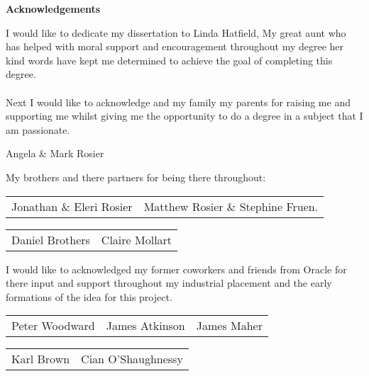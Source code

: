 \thispagestyle{empty}

\begin{center}
    {\LARGE\bf Acknowledgements}
\end{center}
I would like to dedicate my dissertation to Linda Hatfield, My great aunt who has helped with moral support and encouragement throughout my degree her kind words have kept me determined to achieve the goal of completing this degree.\\
\\
Next I would like to acknowledge and my family my parents for raising me and supporting me whilst giving me the opportunity to do a degree in a subject that I am passionate.
\begin{center}
Angela \& Mark Rosier
\end{center}

My brothers and there partners for being there throughout:

\begin{center}
\begin{tabular}{ l r }
Jonathan \& Eleri Rosier & Matthew Rosier \& Stephine Fruen.\\
\end{tabular}
\end{center}

\begin{center}
\begin{tabular}{ l r }
Daniel Brothers & Claire Mollart\\
\end{tabular}
\end{center}

\noindent
I would like to acknowledged my former coworkers and friends from Oracle for there input and support throughout my industrial placement and the early formations of the idea for this project.

\begin{center}
\begin{tabular}{ l c r }
Peter Woodward & James Atkinson & James Maher\\
\end{tabular}
\end{center}

\begin{center}
\begin{tabular}{ l r }
Karl Brown & Cian O'Shaughnessy\\
\end{tabular}
\end{center}

